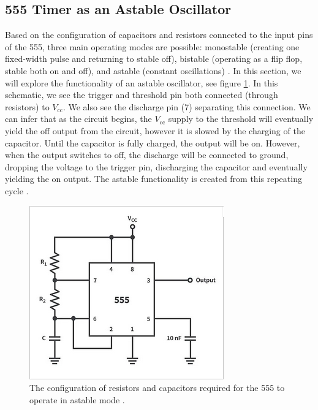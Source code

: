 \documentclass[%
 reprint,
 amsmath,amssymb,
 aps,
]{revtex4-2}
\begin{document}
    \subsection{555 Timer as an Astable Oscillator}
    Based on the configuration of capacitors and resistors connected to the input pins of the 555, three main operating modes are possible: monostable (creating one fixed-width pulse and returning to stable off), bistable (operating as a flip flop, stable both on and off), and astable (constant oscillations) \cite{555Modes}. In this section, we will explore the functionality of an astable oscillator, see figure \ref{fig:astable}. In this schematic, we see the trigger and threshold pin both connected (through resistors) to $V_{\text{cc}}$. We also see the discharge pin (7) separating this connection. We can infer that as the circuit begins, the $V_\text{cc}$ supply to the threshold will eventually yield the off output from the circuit, however it is slowed by the charging of the capacitor. Until the capacitor is fully charged, the output will be on. However, when the output switches to off, the discharge will be connected to ground, dropping the voltage to the trigger pin, discharging the capacitor and eventually yielding the on output. The astable functionality is created from this repeating cycle \cite{555Modes}.

    \begin{figure}
        \includegraphics[width=0.9\columnwidth]{Images/astable.png}
        \caption{\label{fig:astable}The configuration of resistors and capacitors required for the 555 to operate in astable mode \cite{555Modes}.}
    \end{figure}
\end{document}
